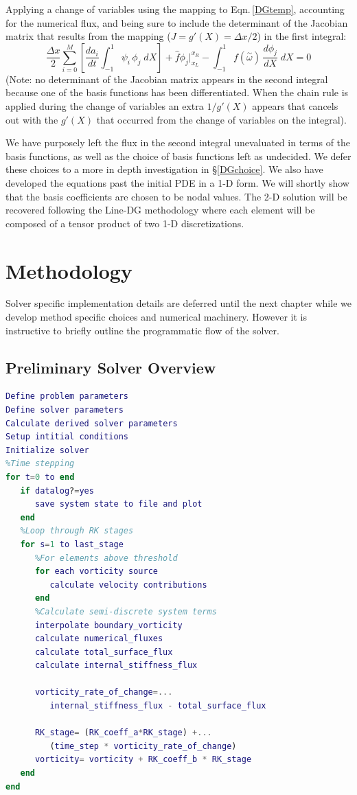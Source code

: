 \documentclass[letterpaper,12pt]{report}
\newcommand{\ben}[1]{\begin{equation}\label{#1}}
\newcommand{\ee}{\end{equation}}
\newcommand{\aomega}{\overset{\sim}{\omega}}				%
\begin{document}
Applying a change of variables using the mapping to Eqn.\,\eqref{DGtemp}, accounting for the numerical flux, and being sure to include the determinant of the Jacobian matrix that results from the mapping ($J=g'(X)=\Delta x/2$) in the first integral:
\ben{DGtemp} \frac{\Delta x}{2}	\sum_{i=0}^M \left[ \frac{d a_i}{dt}	\int_{-1}^{1}\psi_i  \, \phi_j \;dX \right]
+\hat{f}\phi_j \Big|^{x_R}_{x_L} 
- \int_{-1}^{1} f(\aomega) \, \frac{d \phi_j}{dX} \;dX = 0 \ee
(Note: no determinant of the Jacobian matrix appears in the second integral because one of the basis functions has been differentiated. When the chain rule is applied during the change of variables an extra $1/g'(X)$ appears that cancels out with the $g'(X)$ that occurred from the change of variables on the integral).

We have purposely left the flux in the second integral unevaluated in terms of the basis functions, as well as the choice of basis functions left as undecided. We defer these choices to a more in depth investigation in \S \ref{DGchoice}. We also have developed the equations past the initial PDE in a 1-D form. We will shortly show that the basis coefficients are chosen to be nodal values. The 2-D solution will be recovered following the Line-DG methodology \cite{Persson2013} where each element will be composed of a tensor product of two 1-D discretizations.

\chapter{Methodology}
Solver specific implementation details are deferred until the next chapter while we develop method specific choices and numerical machinery. However it is instructive to briefly outline the programmatic flow of the solver.
\section{Preliminary Solver Overview}\label{Pseudo1}
\vspace{-1cm}
\singlespacing
\begin{lstlisting}[language=Matlab]
Define problem parameters
Define solver parameters
Calculate derived solver parameters
Setup intitial conditions
Initialize solver
%Time stepping
for t=0 to end
   if datalog?=yes
      save system state to file and plot
   end
   %Loop through RK stages
   for s=1 to last_stage
      %For elements above threshold
      for each vorticity source
         calculate velocity contributions
      end
      %Calculate semi-discrete system terms
      interpolate boundary_vorticity
      calculate numerical_fluxes
      calculate total_surface_flux
      calculate internal_stiffness_flux
		
      vorticity_rate_of_change=...
         internal_stiffness_flux - total_surface_flux
		
      RK_stage= (RK_coeff_a*RK_stage) +...
         (time_step * vorticity_rate_of_change)
      vorticity= vorticity + RK_coeff_b * RK_stage
   end
end
\end{lstlisting}
\doublespacing
\end{document}
